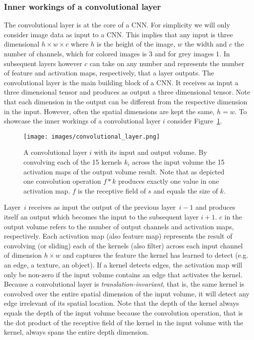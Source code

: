 \documentclass[12pt,a4paper]{article}
\begin{document}
\subsubsection{Inner workings of a convolutional layer}\label{subsec:innerworkconvl}
The convolutional layer is at the core of a CNN. For simplicity we will only consider image data as input to a CNN. This implies that any input is three dimensional $h \times w \times c$ where $h$ is the height of the image, $w$ the width and $c$ the number of channels, which for colored images is 3 and for grey images 1.  In subsequent layers however $c$ can take on any number and represents the number of feature and activation maps, respectively, that a layer outputs. The convolutional layer is the main building block of a CNN. It receives as input a three dimensional tensor and produces as output a three dimensional tensor. Note that each dimension in the output can be different from the respective dimension in the input. However, often the spatial dimensions are kept the same, $h = w$. To showcase the inner workings of a convolutional layer $i$ consider Figure~\ref{fig:conv_layer}. 
\begin{figure}[ht]
\centering
\texttt{[image: images/convolutional\_layer.png]}
\caption{A convolutional layer $i$ with its input and output volume. By convolving each of the 15 kernels $k_i$ across the input volume the 15 activation maps of the output volume result. Note that as depicted one convolution operation $f * k$ produces exactly one value in one activation map. $f$ is the receptive field of $s$ and equals the size of $k$.}
\label{fig:conv_layer}
\end{figure}
Layer~$i$ receives as input the output of the previous layer~$i-1$ and produces itself an output which becomes the input to the subsequent layer $i+1$. $c$ in the output volume refers to the number of output channels and activation maps, respectively. Each activation map (also feature map) represents the result of convolving (or sliding) each of the kernels (also filter) across each input channel of dimension $h \times w$ and captures the feature the kernel has learned to detect (e.g. an edge, a texture, an object). If a kernel detects edges, the activation map will only be non-zero if the input volume contains an edge that activates the kernel. Because a convolutional layer is \textit{translation-invariant}, that is, the same kernel is convolved over the entire spatial dimension of the input volume, it will detect any edge irrelevant of its spatial location. Note that the depth of the kernel always equals the depth of the input volume because the convolution operation, that is the dot product of the receptive field of the kernel in the input volume with the kernel, always spans the entire depth dimension. 
\end{document}

